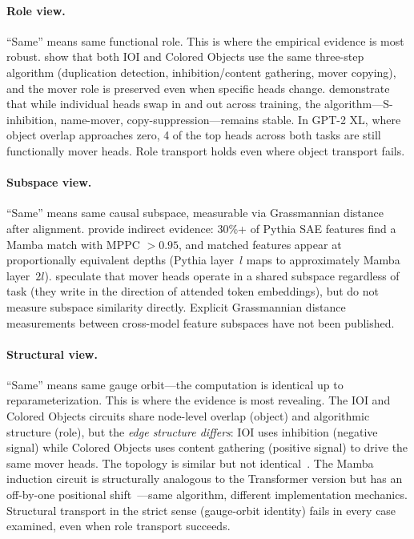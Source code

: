\documentclass{article}
\begin{document}
\paragraph{Role view.}
``Same'' means same functional role. This is where the empirical evidence
is most robust. \citet{merullo2024} show that both IOI and Colored
Objects use the same three-step algorithm (duplication detection,
inhibition/content gathering, mover copying), and the mover role is
preserved even when specific heads change. \citet{tigges2024}
demonstrate that while individual heads swap in and out across training,
the algorithm---S-inhibition, name-mover, copy-suppression---remains
stable. In GPT-2 XL, where object overlap approaches zero, 4 of the top
heads across both tasks are still functionally mover heads. Role
transport holds even where object transport fails.

\paragraph{Subspace view.}
``Same'' means same causal subspace, measurable via Grassmannian distance
after alignment. \citet{wang2024universality} provide indirect evidence:
30\%+ of Pythia SAE features find a Mamba match with MPPC $> 0.95$, and
matched features appear at proportionally equivalent depths (Pythia
layer~$l$ maps to approximately Mamba layer~$2l$). \citet{merullo2024}
speculate that mover heads operate in a shared subspace regardless of
task (they write in the direction of attended token embeddings), but do
not measure subspace similarity directly. Explicit Grassmannian distance
measurements between cross-model feature subspaces have not been
published.

\paragraph{Structural view.}
``Same'' means same gauge orbit---the computation is identical up to
reparameterization. This is where the evidence is most revealing. The
IOI and Colored Objects circuits share node-level overlap (object) and
algorithmic structure (role), but the \emph{edge structure differs}:
IOI uses inhibition (negative signal) while Colored Objects uses content
gathering (positive signal) to drive the same mover heads. The topology
is similar but not identical~\citep{merullo2024}. The Mamba induction
circuit is structurally analogous to the Transformer version but has an
off-by-one positional shift~\citep{wang2024universality}---same
algorithm, different implementation mechanics. Structural transport in
the strict sense (gauge-orbit identity) fails in every case examined,
even when role transport succeeds.
\end{document}
